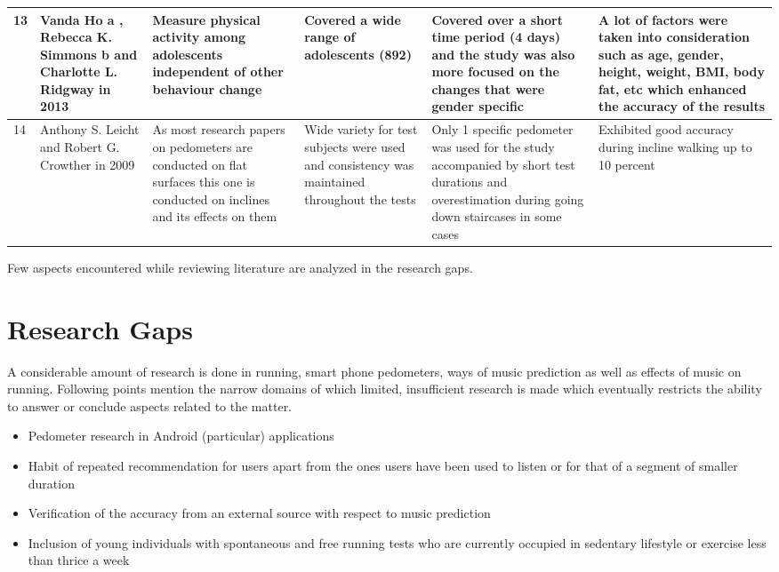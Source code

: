 \documentclass[10pt, a4paper]{article}
\begin{document}
\begin{landscape}
\begin{center}
\begin{tabular}{ | m{0.5cm} | m{3.5cm}| m{5cm} | m{4.5cm}| m{5cm}| m{5.5cm}|}
\hline
13 & Vanda Ho a , Rebecca K. Simmons b and Charlotte L. Ridgway in 2013 & Measure physical activity among adolescents independent of other behaviour change & Covered a wide range of adolescents (892) & Covered over a short time period (4 days) and the study was also more focused on the changes that were gender specific & A lot of factors were taken into consideration such as age, gender, height, weight, BMI, body fat, etc which enhanced the accuracy of the results\\ 
\hline
14 & Anthony S. Leicht and Robert G. Crowther in 2009 & As most research papers on pedometers are conducted on flat surfaces this one is conducted on inclines and its effects on them & Wide variety for test subjects were used and consistency was maintained throughout the tests & Only 1 specific pedometer was used for the study accompanied by short test durations and overestimation during going down staircases in some cases & Exhibited good accuracy during incline walking up to 10 percent \\ 
\hline
\end{tabular}
\end{center}

\end{landscape}

Few aspects encountered while reviewing literature are analyzed in the research gaps.

\section{Research Gaps}
A considerable amount of research is done in running, smart phone pedometers, ways of music prediction as well as effects of music on running. Following points mention the narrow domains of which limited, insufficient research is made which eventually restricts the ability to answer or conclude aspects related to the matter. 
\begin{itemize}
\item Pedometer research in Android (particular) applications
\item Habit of repeated recommendation for users apart from the ones users have been used to listen or for that of a segment of smaller duration
\item Verification of the accuracy from an external source with respect to music prediction 
\item Inclusion of young individuals with spontaneous and free running tests who are currently occupied in sedentary lifestyle or exercise less than thrice a week
\end{itemize}
\end{document}
